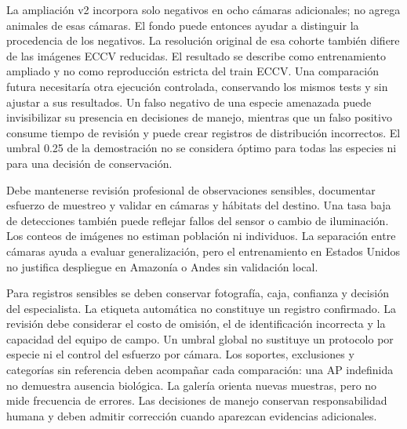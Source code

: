 La ampliación v2 incorpora solo negativos en ocho cámaras adicionales; no agrega animales de esas cámaras.
El fondo puede entonces ayudar a distinguir la procedencia de los negativos. La resolución original
de esa cohorte también difiere de las imágenes ECCV reducidas. El resultado se describe como
entrenamiento ampliado y no como reproducción estricta del train ECCV. Una comparación futura
necesitaría otra ejecución controlada, conservando los mismos tests y sin ajustar a sus resultados.
Un falso negativo de una especie amenazada puede invisibilizar su presencia en decisiones de manejo,
mientras que un falso positivo consume tiempo de revisión y puede crear registros de distribución incorrectos.
El umbral 0.25 de la demostración no se considera óptimo para todas las especies ni para una decisión de conservación.

Debe mantenerse revisión profesional de observaciones sensibles, documentar esfuerzo de muestreo
y validar en cámaras y hábitats del destino. Una tasa baja de detecciones también puede reflejar
fallos del sensor o cambio de iluminación. Los conteos de imágenes no estiman población ni individuos.
La separación entre cámaras ayuda a evaluar generalización, pero el entrenamiento en Estados Unidos
no justifica despliegue en Amazonía o Andes sin validación local.

Para registros sensibles se deben conservar fotografía, caja, confianza y decisión
del especialista. La etiqueta automática no constituye un registro confirmado.
La revisión debe considerar el costo de omisión, el de identificación incorrecta
y la capacidad del equipo de campo. Un umbral global no sustituye un protocolo
por especie ni el control del esfuerzo por cámara. Los soportes, exclusiones y
categorías sin referencia deben acompañar cada comparación: una AP indefinida no
demuestra ausencia biológica. La galería orienta nuevas muestras, pero no mide
frecuencia de errores. Las decisiones de manejo conservan responsabilidad humana
y deben admitir corrección cuando aparezcan evidencias adicionales.
